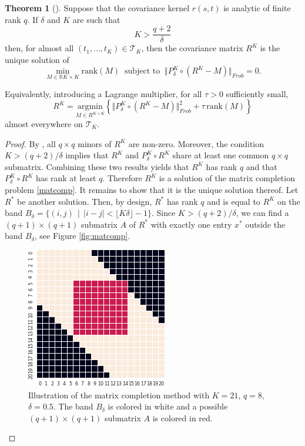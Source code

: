 \documentclass[10pt, a4paper]{report}
\newcommand{\R}[0]{\mathbb{R}}
\theoremstyle{definition}
\newtheorem{theorem}{Theorem}
\theoremstyle{remark}
\begin{document}
\begin{theorem}[\cite{DP2}]
	Suppose that the covariance kernel $r(s,t)$ is analytic of finite rank $q$. If $\delta$ and $K$ are such that 
	$$K>\frac{q+2}{\delta}$$
	then, for almost all $(t_1,...,t_K) \in \mathcal{T}_K$, then the covariance matrix $R^K$ is the unique solution of 
	\begin{equation}\label{matcomp}
		\min_{M \in \R{K \times K}} \text{rank}(M) \ \text{ subject to } \ \Vert P_\delta^K \circ (R^K - M) \Vert_{Frob}=0.
	\end{equation}

	Equivalently, introducing a Lagrange multiplier, for all $\tau>0$ sufficiently small,
	\[R^K = \underset{M \in R^{K\times K}}{\text{argmin}} \left\{\Vert P_\delta^K \circ (R^K - M) \Vert_{Frob}^2 + \tau \, \text{rank}(M) \right\} \]
	almost everywhere on $\mathcal{T}_K$.
	\begin{proof}
		By \cite[Theorem 4]{DP1}, all $q\times q$ minors of $R^K$ are non-zero. Moreover, the condition $K>(q+2)/\delta$ implies that $R^K$ and $P_\delta^K \circ R^K$  share at least one common $q\times q$  submatrix. Combining these two results yields that $R^K$ has rank $q$ and that $P_\delta^K \circ R^K$ has rank at least $q$. Therefore $R^K$ is a solution of the matrix completion problem \ref{matcomp}. It remains to show that it is the unique solution thereof. Let $R^*$ be another solution. Then, by design, $R^*$ has rank $q$ and is equal to $R^K$ on the band $B_\delta=\{(i,j) \, \mid \, \vert i-j\vert < \lfloor{K\delta}\rfloor -1\}$. Since $K>(q+2)/\delta$, we can find a $(q+1)\times (q+1)$ submatrix $A$ of $R^*$ with exactly one entry $x^*$ outside the band $B_\delta$, see Figure \ref{fig:matcomp}.
		\begin{figure}[ht]
		\centering
		\includegraphics[width=0.5\linewidth]{Code/images/24/matcomp}
		\caption{Illustration of the matrix completion method with $K=21$, $q=8$, $\delta=0.5$. The band $B_\delta$ is colored in white and a possible $(q+1)\times (q+1)$ submatrix $A$ is colored in red.}

\end{figure}
\end{proof}
\end{theorem}
\end{document}
